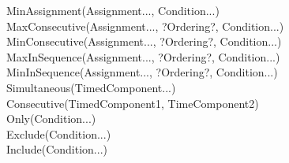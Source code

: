 \begin{description}
\item[MinAssignment(Assignment..., Condition...)]		
	
\item[MaxConsecutive(Assignment..., ?Ordering?, Condition...)]	
		
\item[MinConsecutive(Assignment..., ?Ordering?, Condition...)]	
		
\item[MaxInSequence(Assignment..., ?Ordering?, Condition...)]	
		
\item[MinInSequence(Assignment..., ?Ordering?, Condition...)]			
	
\item[Simultaneous(TimedComponent...)]	
	
\item[Consecutive(TimedComponent1, TimeComponent2)]	
	
\item[Only(Condition...)]	
	 
\item[Exclude(Condition...)]	
	
\item[Include(Condition...)]	
	 
\end{description}